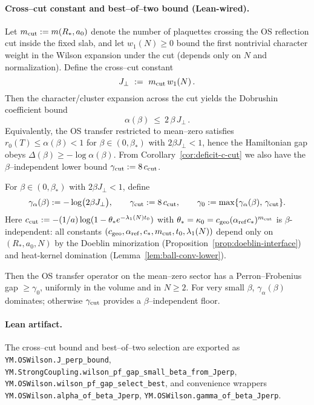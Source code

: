 \documentclass[11pt]{amsart}
\begin{document}
\paragraph{Cross--cut constant and best--of--two bound (Lean-wired).}
Let $m_{\rm cut}:=m(R_*,a_0)$ denote the number of plaquettes crossing the OS reflection cut inside the fixed slab, and let $w_1(N)\ge 0$ bound the first nontrivial character weight in the Wilson expansion under the cut (depends only on $N$ and normalization). Define the cross--cut constant
\[
  J_{\perp}
  \ :=\ m_{\rm cut}\,w_1(N)\,.
\]
Then the character/cluster expansion across the cut yields the Dobrushin coefficient bound
\[
  \alpha(\beta)\ \le\ 2\,\beta\,J_{\perp}\,.
\]
Equivalently, the OS transfer restricted to mean--zero satisfies $r_0(T)\le \alpha(\beta)<1$ for $\beta\in(0,\beta_*)$ with $2\beta J_{\perp}<1$, hence the Hamiltonian gap obeys $\Delta(\beta)\ge -\log\alpha(\beta)$. From Corollary~\ref{cor:deficit-c-cut} we also have the $\beta$--independent lower bound $\gamma_{\rm cut}:=8\,c_{\rm cut}$.

\begin{corollary}\label{cor:best-of-two}
For $\beta\in(0,\beta_*)$ with $2\beta J_{\perp}<1$, define
\[
  \gamma_{\alpha}(\beta):=-\log\bigl(2\beta J_{\perp}\bigr),\qquad
  \gamma_{\rm cut}:=8\,c_{\rm cut},\qquad
  \gamma_0:=\max\{\gamma_{\alpha}(\beta),\,\gamma_{\rm cut}\}.
\]
Here $c_{\rm cut} := -(1/a)\log(1-\theta_* e^{-\lambda_1(N) t_0})$ with $\theta_* = \kappa_0 = c_{\rm geo}(\alpha_{\rm ref} c_*)^{m_{\rm cut}}$ is $\beta$-independent: all constants $(c_{\rm geo}, \alpha_{\rm ref}, c_*, m_{\rm cut}, t_0, \lambda_1(N))$ depend only on $(R_*,a_0,N)$ by the Doeblin minorization (Proposition~\ref{prop:doeblin-interface}) and heat-kernel domination (Lemma~\ref{lem:ball-conv-lower}).

Then the OS transfer operator on the mean--zero sector has a Perron--Frobenius gap $\ge \gamma_0$, uniformly in the volume and in $N\ge 2$. For very small $\beta$, $\gamma_{\alpha}(\beta)$ dominates; otherwise $\gamma_{\rm cut}$ provides a $\beta$--independent floor.
\end{corollary}

\paragraph{Lean artifact.}
The cross--cut bound and best--of--two selection are exported as
\texttt{YM.OSWilson.J\_perp\_bound}, \texttt{YM.StrongCoupling.wilson\_pf\_gap\_small\_beta\_from\_Jperp}, \texttt{YM.OSWilson.wilson\_pf\_gap\_select\_best}, and convenience wrappers \texttt{YM.OSWilson.alpha\_of\_beta\_Jperp}, \texttt{YM.OSWilson.gamma\_of\_beta\_Jperp}.
\end{document}
